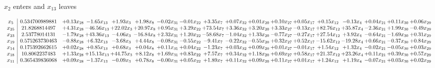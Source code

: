 \documentclass[9pt]{article}
\begin{document}
 $ x_{2} $ enters and $ x_{13} $ leaves 

 \[\begin{array}{c| c c@{\hskip 2pt} c@{\hskip 2pt} c@{\hskip 2pt} c@{\hskip 2pt} c@{\hskip 2pt} c@{\hskip 2pt} c@{\hskip 2pt} c@{\hskip 2pt} c@{\hskip 2pt} c@{\hskip 2pt} c@{\hskip 2pt} c@{\hskip 2pt} c@{\hskip 2pt} c@{\hskip 2pt} c@{\hskip 2pt} c@{\hskip 2pt} }
 x_{5}   &  0.534700989881 & +  0.13 x_{28} & -1.65 x_{13} & +  1.93 x_{3} & +  1.98 x_{8} & -0.02 x_{31} & -0.01 x_{22} & +  3.35 x_{7} & +  0.07 x_{32} & +  0.01 x_{20} & +  0.10 x_{27} & +  0.05 x_{17} & +  0.15 x_{12} & -0.13 x_{4} & +  0.04 x_{21} & +  0.11 x_{30} & +  0.06 x_{29}\\
 x_{25}   &  21.8268814497 & +  4.31 x_{28} & -46.56 x_{13} & + 22.02 x_{3} & + 20.97 x_{8} & +  0.95 x_{31} & +  3.29 x_{22} & + 73.54 x_{7} & +  3.36 x_{32} & +  3.20 x_{20} & +  3.33 x_{27} & -0.13 x_{17} & + 82.76 x_{12} & + 35.87 x_{4} & -2.36 x_{21} & +  1.99 x_{30} & -0.49 x_{29}\\
 x_{23}   &  2.53778014131 & -1.79 x_{28} & + 43.36 x_{13} & -4.06 x_{3} & -16.84 x_{8} & +  2.32 x_{31} & +  1.20 x_{22} & -58.68 x_{7} & -1.04 x_{32} & +  1.33 x_{20} & -0.77 x_{27} & -0.27 x_{17} & + 27.54 x_{12} & +  3.92 x_{4} & -0.64 x_{21} & -1.69 x_{30} & +  0.31 x_{29}\\
 x_{19}   &  0.575263730463 & -0.88 x_{28} & +  6.32 x_{13} & -3.68 x_{3} & +  4.44 x_{8} & -0.08 x_{31} & -0.55 x_{22} & -9.41 x_{7} & -0.22 x_{32} & -0.55 x_{20} & +  0.32 x_{27} & +  0.52 x_{17} & -15.62 x_{12} & -19.28 x_{4} & +  0.66 x_{21} & -0.37 x_{30} & +  0.84 x_{29}\\
 x_{14}   &  0.175392662615 & +  0.02 x_{28} & +  0.85 x_{13} & +  0.68 x_{3} & +  0.04 x_{8} & +  0.11 x_{31} & +  0.04 x_{22} & -1.23 x_{7} & +  0.03 x_{32} & +  0.09 x_{20} & +  0.01 x_{27} & -0.01 x_{17} & +  1.54 x_{12} & +  1.32 x_{4} & -0.02 x_{21} & -0.05 x_{30} & +  0.03 x_{29}\\
 x_{18}   &  10.8062237483 & +  1.33 x_{28} & + 15.13 x_{13} & + 44.75 x_{3} & +  8.12 x_{8} & +  1.69 x_{31} & +  0.83 x_{22} & +  7.57 x_{7} & +  0.34 x_{32} & +  1.18 x_{20} & +  0.69 x_{27} & +  0.58 x_{17} & + 21.37 x_{12} & + 23.26 x_{4} & +  0.11 x_{21} & +  0.39 x_{30} & +  0.57 x_{29}\\
 x_{11}   &  0.365439836068 & +  0.09 x_{28} & -1.37 x_{13} & -0.09 x_{3} & +  0.78 x_{8} & -0.00 x_{31} & +  0.05 x_{22} & +  1.89 x_{7} & +  0.11 x_{32} & +  0.09 x_{20} & +  0.11 x_{27} & +  0.01 x_{17} & +  1.24 x_{12} & +  1.19 x_{4} & -0.07 x_{21} & +  0.03 x_{30} & +  0.02 x_{29}\\

\end{array}\]
\end{document}
